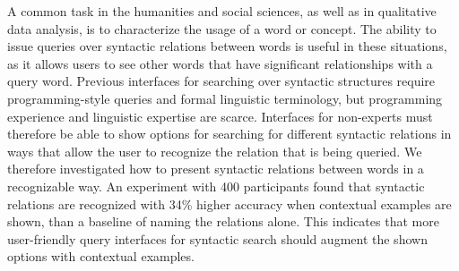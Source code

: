 
A common task in the humanities and social sciences, as well as in qualitative data analysis, is to characterize the usage of a word or concept. The ability to issue queries over syntactic relations between words is useful in these situations, as it allows users to see other words that have significant relationships with a query word. Previous interfaces for  searching over syntactic structures require programming-style queries and formal linguistic terminology, but programming experience and linguistic expertise are scarce. Interfaces for non-experts must therefore be able to show options for searching for different syntactic relations in ways that allow the user to recognize the relation that is being queried. We therefore investigated how to present syntactic relations between words in a recognizable way. An experiment with 400 participants found that syntactic relations are recognized with 34\% higher accuracy when contextual examples are shown, than a baseline of naming the relations alone.  This indicates that more user-friendly query interfaces for syntactic search should augment the shown options with contextual examples.
